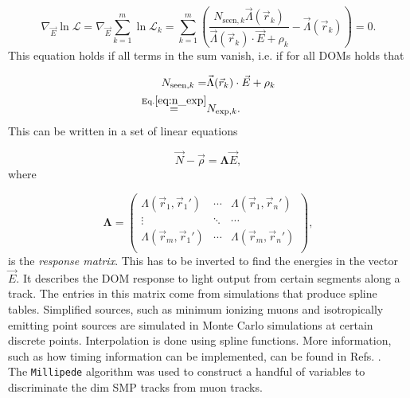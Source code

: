 \begin{equation}
\nabla_{\vec{E}} \ln \mathcal{L} = \nabla_{\vec{E}} \sum^m_{k=1} \ln \mathcal{L}_k = \sum^m_{k=1} \left(\frac{N_{\textrm{seen},k} \vec{\Lambda}(\vec{r}_k)}{\vec{\Lambda}(\vec{r}_k) \cdot \vec{E} + \rho_k} - \vec{\Lambda}(\vec{r}_k) \right) = 0.
\end{equation}
\noindent This equation holds if all terms in the sum vanish, i.e. if for all DOMs holds that

\begin{equation}
\begin{split}
N_{\textrm{seen},k} = &\vec{\Lambda}(\vec{r}_k) \cdot \vec{E} + \rho_k\\
\overset{\textrm{Eq.}\ref{eq:n_exp}}{=} &N_{\textrm{exp},k}
.
\end{split}
\end{equation}
\noindent This can be written in a set of linear equations

\begin{equation}
\vec{N} - \vec{\rho} = \mathbf{\Lambda} \vec{E}, 
\end{equation}
\noindent where

\begin{equation}
\mathbf{\Lambda} = 
\begin{pmatrix}
\Lambda(\vec{r}_1,\vec{r}_1') & \cdots & \Lambda(\vec{r}_1,\vec{r}_n')\\
\vdots  & \ddots & \cdots \\
\Lambda(\vec{r}_m,\vec{r}_1') & \cdots & \Lambda(\vec{r}_m,\vec{r}_n')\\
\end{pmatrix},
\end{equation}
\noindent is the \textit{response matrix}. This has to be inverted to find the energies in the vector $\vec{E}$. It describes the DOM response to light output from certain segments along a track. The entries in this matrix come from simulations that produce spline tables. Simplified sources, such as minimum ionizing muons and isotropically emitting point sources are simulated in Monte Carlo simulations at certain discrete points. Interpolation is done using spline functions. More information, such as how timing information can be implemented, can be found in Refs. \cite{millipedeinternal,stefthesis}.\\

\noindent The \texttt{Millipede} algorithm was used to construct a handful of variables to discriminate the dim SMP tracks from muon tracks.

